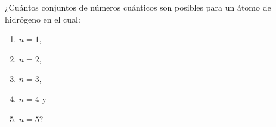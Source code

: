 \item ¿Cuántos conjuntos de números cuánticos son posibles para un átomo de hidrógeno en el cual:
\begin{enumerate}
    \item $n = 1$,
    \item $n = 2$,
    \item $n = 3$,
    \item $n = 4$ y
    \item $n = 5$?
\end{enumerate}